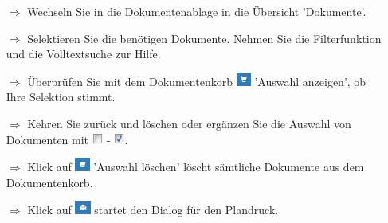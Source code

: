 \documentclass{article}
\begin{document}

\pagebreak
{}

\vspace{\baselineskip}


\begin{multicols}{2}

\begin{tcolorbox}[colback=blue!5,colframe=blue!40!black,title=Dokumente für den Plandruck selektieren]
\begin{itemize}
  \item[$\Longrightarrow$] Wechseln Sie in die Dokumentenablage in die Übersicht 'Dokumente'. 
  \item[$\Longrightarrow$] Selektieren Sie die benötigen Dokumente. Nehmen Sie die Filterfunktion und die Volltextsuche zur Hilfe.
  \item[$\Longrightarrow$] Überprüfen Sie mit dem Dokumentenkorb \includegraphics[height=12pt]{Icons/dk_korb_b.jpg} 'Auswahl anzeigen', ob Ihre Selektion stimmt.
  \item[$\Longrightarrow$] Kehren Sie zurück und löschen oder ergänzen Sie die Auswahl von Dokumenten mit \includegraphics[height=10pt]{Icons/checkbox_leer.png} - \includegraphics[height=10pt]{Icons/checkbox_markiert.png}.
	\item[$\Longrightarrow$] Klick auf \includegraphics[height=12pt]{Icons/dk_korb_b.jpg} 'Auswahl löschen' löscht sämtliche Dokumente aus dem Dokumentenkorb.
	\item[$\Longrightarrow$] Klick auf \includegraphics[height=12pt]{Icons/dk_drucken.jpg} startet den Dialog für den Plandruck.
\end{itemize}
\end{tcolorbox}



\end{multicols}
\end{document}
